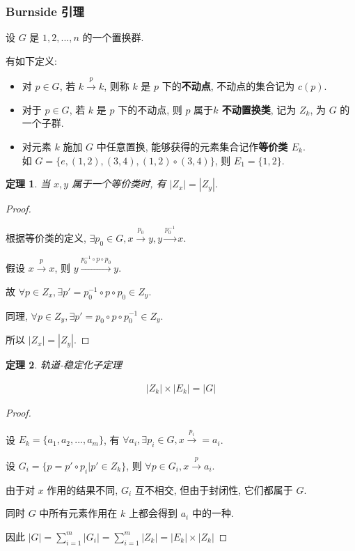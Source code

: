 \documentclass{ctexart}
\newtheorem{theorem}{定理}[section]  %
\begin{document}
\subsubsection{Burnside 引理}
设 $G$ 是 $1,2,...,n$ 的一个置换群.

有如下定义:

\begin{itemize}
    \item 对 $p \in G$, 若 $k \xrightarrow{p} k$, 则称 $k$ 是 $p$ 下的\textbf{不动点}, 不动点的集合记为 $c(p)$.
    \item 对于 $p \in G$, 若 $k$ 是 $p$ 下的不动点, 则 $p$ 属于\textbf{$k$ 不动置换类}, 记为 $Z_k$, 为 $G$ 的一个子群.
    \item 对元素 $k$ 施加 $G$ 中任意置换, 能够获得的元素集合记作\textbf{等价类 $E_k$}.\\
          如 $G=\{e,(1,2),(3,4),(1,2)\circ (3,4)\}$, 则 $E_1=\{1,2\}$.
\end{itemize}

\begin{theorem} 
    当 $x,y$ 属于一个等价类时, 有 $|Z_x|=|Z_y|$.
\end{theorem}

\begin{proof}\ 

    根据等价类的定义, $\exists p_0 \in G, x \xrightarrow{p_0} y, y \xrightarrow{p_0^{-1}} x$.

    假设 $x \xrightarrow{p} x$, 则 $y \xrightarrow{p_0^{-1}\circ p \circ p_0} y$.

    故 $\forall p \in Z_x, \exists p'=p_0^{-1}\circ p \circ p_0 \in Z_y$.

    同理, $\forall p \in Z_y, \exists p'=p_0\circ p \circ p_0^{-1} \in Z_y$.

    所以 $|Z_x|=|Z_y|$.
\end{proof}

\begin{theorem} 轨道-稳定化子定理

    \begin{align*}
        |Z_k| \times |E_k| = |G|
    \end{align*}
\end{theorem}

\begin{proof}\ 

    设 $E_k=\{a_1,a_2,...,a_m\}$, 有 $\forall a_i, \exists p_i \in G, x \xrightarrow{p_i}=a_i$.

    设 $G_i = \{p = p' \circ p_i | p' \in Z_k\}$, 则 $\forall p \in G_i, x \xrightarrow{p} a_i$.

    由于对 $x$ 作用的结果不同, $G_i$ 互不相交, 但由于封闭性, 它们都属于 $G$. 
    
    同时 $G$ 中所有元素作用在 $k$ 上都会得到 $a_i$ 中的一种.
    
    因此 $|G|=\sum_{i=1}^{m} |G_i| = \sum_{i=1}^{m} |Z_k| = |E_k| \times |Z_k|$

\end{proof}
\end{document}
